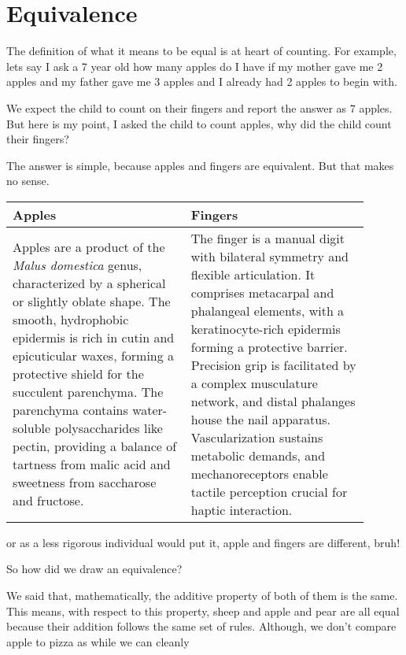 \section{Equivalence}
The definition of what it means to be equal is at heart of counting. For example, 
lets say I ask a 7 year old how many apples do I have if my mother gave me 2 apples and 
my father gave me 3 apples and I already had 2 apples to begin with.\par
We expect the child to count on their fingers and report the answer as 7 apples. 
But here is my point, I asked the child to count apples, why did the child count their fingers?\par
The answer is simple, because apples and fingers are equivalent. But that makes no sense.
\begin{table}[H]
    \centering
    \begin{tabular}{|p{0.45\linewidth}|p{0.45\linewidth}|}
        \hline
        \textbf{Apples} & \textbf{Fingers} \\
        \hline
        Apples are a product of the \textit{Malus domestica} genus, 
        characterized by a spherical or slightly oblate shape. The smooth,
         hydrophobic epidermis is rich in cutin and epicuticular waxes, 
         forming a protective shield for the succulent parenchyma. 
         The parenchyma contains water-soluble polysaccharides like pectin, 
         providing a balance of tartness from malic acid and sweetness from 
         saccharose and fructose. & 
         The finger is a manual digit with bilateral symmetry and flexible articulation. 
         It comprises metacarpal and phalangeal elements, with a keratinocyte-rich epidermis 
         forming a protective barrier. Precision grip is facilitated by a complex musculature 
         network, and distal phalanges house the nail apparatus. Vascularization sustains metabolic 
         demands, and mechanoreceptors enable tactile perception crucial for haptic interaction. \\
        \hline
    \end{tabular}
\end{table}
or as a less rigorous individual would put it, apple and fingers are different, bruh!\par
So how did we draw an equivalence?\par
We said that, mathematically, the additive property of both of them is the same. This means, 
with respect to this property, sheep and apple and pear are all equal because their addition 
follows the same set of rules. Although, we don't compare apple to pizza as while we can cleanly 
